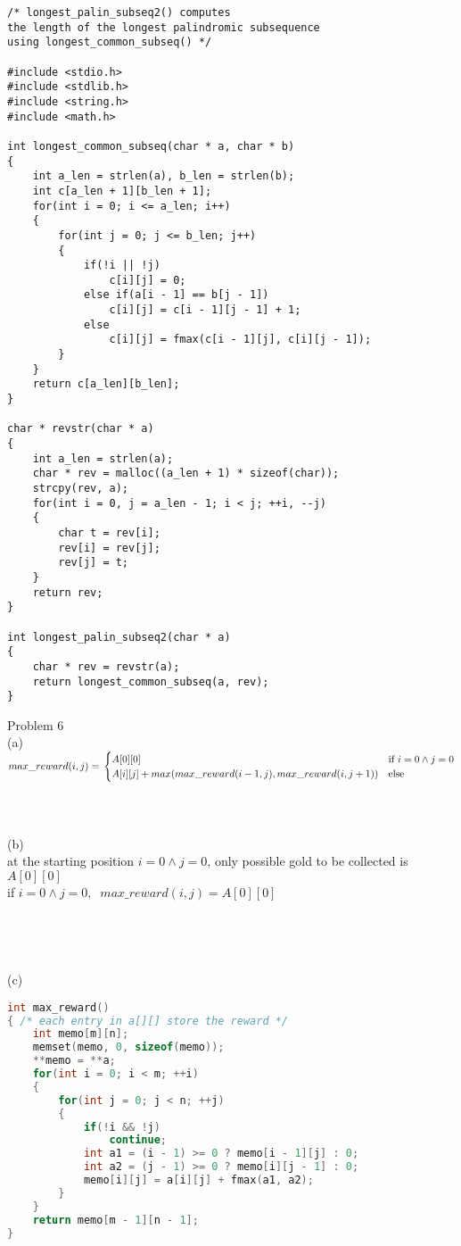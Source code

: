 \documentclass[12pt,border=4pt,multi]{article}%
\begin{document}
\begin{lstlisting}
/* longest_palin_subseq2() computes 
the length of the longest palindromic subsequence
using longest_common_subseq() */

#include <stdio.h>
#include <stdlib.h>
#include <string.h>
#include <math.h>

int longest_common_subseq(char * a, char * b)
{
    int a_len = strlen(a), b_len = strlen(b);
    int c[a_len + 1][b_len + 1];
    for(int i = 0; i <= a_len; i++)
    {
        for(int j = 0; j <= b_len; j++)
        {
            if(!i || !j)
                c[i][j] = 0;
            else if(a[i - 1] == b[j - 1])
                c[i][j] = c[i - 1][j - 1] + 1;
            else
                c[i][j] = fmax(c[i - 1][j], c[i][j - 1]);
        }
    }
    return c[a_len][b_len];
}

char * revstr(char * a)
{
    int a_len = strlen(a);
    char * rev = malloc((a_len + 1) * sizeof(char));
    strcpy(rev, a);
    for(int i = 0, j = a_len - 1; i < j; ++i, --j)
    {
        char t = rev[i];
        rev[i] = rev[j];
        rev[j] = t;
    }
    return rev;
}

int longest_palin_subseq2(char * a)
{
    char * rev = revstr(a);
    return longest_common_subseq(a, rev);
}
\end{lstlisting}
\newpage
\noindent
Problem 6\\
(a)\\
$max\_reward(i, j) =\\
\begin{cases}
A[0][0] & \text{if } i = 0 \wedge j = 0\\
A[i][j] + max(max\_reward(i - 1, j), max\_reward(i, j + 1)) & \text{else}\\
\end{cases}$
\\
\\
\\
\\
(b)\\
at the starting position $i = 0 \wedge j = 0$, only possible gold to be collected is $A[0][0]$\\
if $i = 0 \wedge j = 0,\;\; max\_reward(i, j) = A[0][0]$\\ 
\\
\\
\\
\\
(c)
\begin{lstlisting}[language = c]
int max_reward()
{ /* each entry in a[][] store the reward */
    int memo[m][n];
    memset(memo, 0, sizeof(memo));
    **memo = **a;
    for(int i = 0; i < m; ++i)
    {
        for(int j = 0; j < n; ++j)
        {
            if(!i && !j)
                continue;
            int a1 = (i - 1) >= 0 ? memo[i - 1][j] : 0;
            int a2 = (j - 1) >= 0 ? memo[i][j - 1] : 0;
            memo[i][j] = a[i][j] + fmax(a1, a2);
        }
    }
    return memo[m - 1][n - 1];
}
\end{lstlisting}
\end{document}
